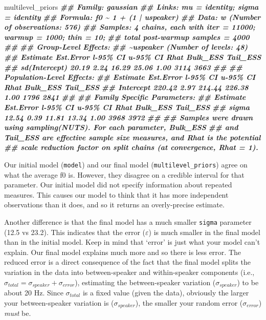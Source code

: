 \documentclass[
]{book}
\newenvironment{Shaded}{\begin{snugshade}}{\end{snugshade}}
\newcommand{\DocumentationTok}[1]{\textcolor[rgb]{0.56,0.35,0.01}{\textbf{\textit{#1}}}}
\newcommand{\NormalTok}[1]{#1}
\begin{document}
\begin{Shaded}
\begin{Highlighting}[]
\NormalTok{multilevel\_priors}
\DocumentationTok{\#\#  Family: gaussian }
\DocumentationTok{\#\#   Links: mu = identity; sigma = identity }
\DocumentationTok{\#\# Formula: f0 \textasciitilde{} 1 + (1 | uspeaker) }
\DocumentationTok{\#\#    Data: w (Number of observations: 576) }
\DocumentationTok{\#\# Samples: 4 chains, each with iter = 11000; warmup = 1000; thin = 10;}
\DocumentationTok{\#\#          total post{-}warmup samples = 4000}
\DocumentationTok{\#\# }
\DocumentationTok{\#\# Group{-}Level Effects: }
\DocumentationTok{\#\# \textasciitilde{}uspeaker (Number of levels: 48) }
\DocumentationTok{\#\#               Estimate Est.Error l{-}95\% CI u{-}95\% CI Rhat Bulk\_ESS Tail\_ESS}
\DocumentationTok{\#\# sd(Intercept)    20.19      2.24    16.29    25.06 1.00     3114     3663}
\DocumentationTok{\#\# }
\DocumentationTok{\#\# Population{-}Level Effects: }
\DocumentationTok{\#\#           Estimate Est.Error l{-}95\% CI u{-}95\% CI Rhat Bulk\_ESS Tail\_ESS}
\DocumentationTok{\#\# Intercept   220.42      2.97   214.44   226.38 1.00     1796     2841}
\DocumentationTok{\#\# }
\DocumentationTok{\#\# Family Specific Parameters: }
\DocumentationTok{\#\#       Estimate Est.Error l{-}95\% CI u{-}95\% CI Rhat Bulk\_ESS Tail\_ESS}
\DocumentationTok{\#\# sigma    12.54      0.39    11.81    13.34 1.00     3968     3972}
\DocumentationTok{\#\# }
\DocumentationTok{\#\# Samples were drawn using sampling(NUTS). For each parameter, Bulk\_ESS}
\DocumentationTok{\#\# and Tail\_ESS are effective sample size measures, and Rhat is the potential}
\DocumentationTok{\#\# scale reduction factor on split chains (at convergence, Rhat = 1).}
\end{Highlighting}
\end{Shaded}

Our initial model (\texttt{model}) and our final model (\texttt{multilevel\_priors}) agree on what the average f0 is. However, they disagree on a credible interval for that parameter. Our initial model did not specify information about repeated measures. This causes our model to think that it has more independent observations than it does, and so it returns an overly-precise estimate.

Another difference is that the final model has a much smaller \texttt{sigma} parameter (12.5 vs 23.2). This indicates that the error (\(\varepsilon\)) is much smaller in the final model than in the initial model. Keep in mind that `error' is just what your model can't explain. Our final model explains much more and so there is less error. The reduced error is a direct consequence of the fact that the final model splits the variation in the data into between-speaker and within-speaker components (i.e., \(\sigma_{total}=\sigma_{speaker}+\sigma_{error}\)), estimating the between-speaker variation (\(\sigma_{speaker}\)) to be about 20 Hz. Since \(\sigma_{total}\) is a fixed value (given the data), obviously the larger your between-speaker variation is (\(\sigma_{speaker}\)), the smaller your random error (\(\sigma_{error}\)) \emph{must} be.
\end{document}
